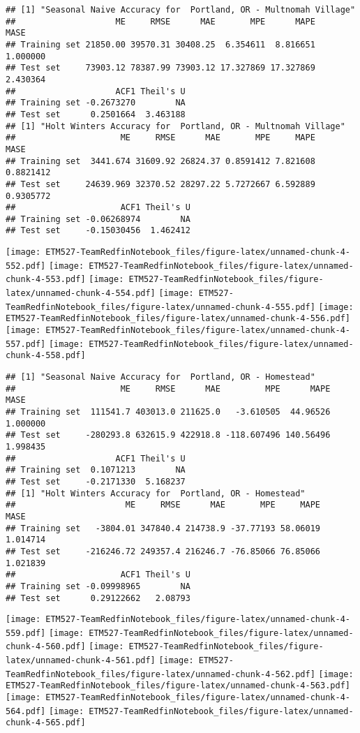 \documentclass[]{article}
\begin{document}
\begin{verbatim}
## [1] "Seasonal Naive Accuracy for  Portland, OR - Multnomah Village"
##                    ME     RMSE      MAE       MPE      MAPE     MASE
## Training set 21850.00 39570.31 30408.25  6.354611  8.816651 1.000000
## Test set     73903.12 78387.99 73903.12 17.327869 17.327869 2.430364
##                    ACF1 Theil's U
## Training set -0.2673270        NA
## Test set      0.2501664  3.463188
## [1] "Holt Winters Accuracy for  Portland, OR - Multnomah Village"
##                     ME     RMSE      MAE       MPE     MAPE      MASE
## Training set  3441.674 31609.92 26824.37 0.8591412 7.821608 0.8821412
## Test set     24639.969 32370.52 28297.22 5.7272667 6.592889 0.9305772
##                     ACF1 Theil's U
## Training set -0.06268974        NA
## Test set     -0.15030456  1.462412
\end{verbatim}

\texttt{[image: ETM527-TeamRedfinNotebook\_files/figure-latex/unnamed-chunk-4-552.pdf]}
\texttt{[image: ETM527-TeamRedfinNotebook\_files/figure-latex/unnamed-chunk-4-553.pdf]}
\texttt{[image: ETM527-TeamRedfinNotebook\_files/figure-latex/unnamed-chunk-4-554.pdf]}
\texttt{[image: ETM527-TeamRedfinNotebook\_files/figure-latex/unnamed-chunk-4-555.pdf]}
\texttt{[image: ETM527-TeamRedfinNotebook\_files/figure-latex/unnamed-chunk-4-556.pdf]}
\texttt{[image: ETM527-TeamRedfinNotebook\_files/figure-latex/unnamed-chunk-4-557.pdf]}
\texttt{[image: ETM527-TeamRedfinNotebook\_files/figure-latex/unnamed-chunk-4-558.pdf]}

\begin{verbatim}
## [1] "Seasonal Naive Accuracy for  Portland, OR - Homestead"
##                     ME     RMSE      MAE         MPE      MAPE     MASE
## Training set  111541.7 403013.0 211625.0   -3.610505  44.96526 1.000000
## Test set     -280293.8 632615.9 422918.8 -118.607496 140.56496 1.998435
##                    ACF1 Theil's U
## Training set  0.1071213        NA
## Test set     -0.2171330  5.168237
## [1] "Holt Winters Accuracy for  Portland, OR - Homestead"
##                      ME     RMSE      MAE       MPE     MAPE     MASE
## Training set   -3804.01 347840.4 214738.9 -37.77193 58.06019 1.014714
## Test set     -216246.72 249357.4 216246.7 -76.85066 76.85066 1.021839
##                     ACF1 Theil's U
## Training set -0.09998965        NA
## Test set      0.29122662   2.08793
\end{verbatim}

\texttt{[image: ETM527-TeamRedfinNotebook\_files/figure-latex/unnamed-chunk-4-559.pdf]}
\texttt{[image: ETM527-TeamRedfinNotebook\_files/figure-latex/unnamed-chunk-4-560.pdf]}
\texttt{[image: ETM527-TeamRedfinNotebook\_files/figure-latex/unnamed-chunk-4-561.pdf]}
\texttt{[image: ETM527-TeamRedfinNotebook\_files/figure-latex/unnamed-chunk-4-562.pdf]}
\texttt{[image: ETM527-TeamRedfinNotebook\_files/figure-latex/unnamed-chunk-4-563.pdf]}
\texttt{[image: ETM527-TeamRedfinNotebook\_files/figure-latex/unnamed-chunk-4-564.pdf]}
\texttt{[image: ETM527-TeamRedfinNotebook\_files/figure-latex/unnamed-chunk-4-565.pdf]}
\end{document}
